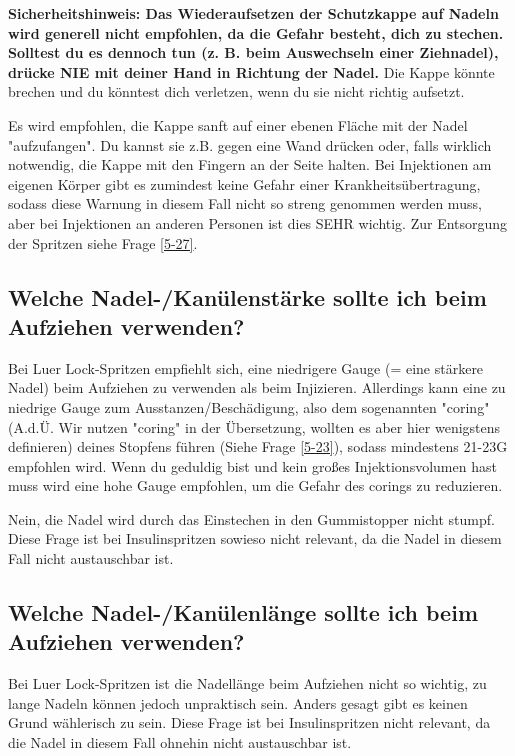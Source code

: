 \documentclass{article}
\begin{document}
\textbf{Sicherheitshinweis: Das Wiederaufsetzen der Schutzkappe auf Nadeln wird generell nicht empfohlen, da die Gefahr besteht, dich zu stechen. Solltest du es dennoch tun (z. B. beim Auswechseln einer Ziehnadel), drücke NIE mit deiner Hand in Richtung der Nadel.} Die Kappe könnte brechen und du könntest dich verletzen, wenn du sie nicht richtig aufsetzt.

Es wird empfohlen, die Kappe sanft auf einer ebenen Fläche mit der Nadel "aufzufangen". Du kannst sie z.B. gegen eine Wand drücken oder, falls wirklich notwendig, die Kappe mit den Fingern an der Seite halten. Bei Injektionen am eigenen Körper gibt es zumindest keine Gefahr einer Krankheitsübertragung, sodass diese Warnung in diesem Fall nicht so streng genommen werden muss, aber bei Injektionen an anderen Personen ist dies SEHR wichtig. Zur Entsorgung der Spritzen siehe Frage \ref{5-27}.

\subsection{Welche Nadel-/Kanülenstärke sollte ich beim Aufziehen verwenden?}

Bei Luer Lock-Spritzen empfiehlt sich, eine niedrigere Gauge (= eine stärkere Nadel) beim Aufziehen zu verwenden als beim Injizieren. Allerdings kann eine zu niedrige Gauge zum Ausstanzen/Beschädigung, also dem sogenannten "coring" (A.d.Ü. Wir nutzen "coring" in der Übersetzung, wollten es aber hier wenigstens definieren) deines Stopfens führen (Siehe Frage \ref{5-23}), sodass mindestens 21-23G empfohlen wird. Wenn du geduldig bist und kein großes Injektionsvolumen hast muss wird eine hohe Gauge empfohlen, um die Gefahr des corings zu reduzieren. 

Nein, die Nadel wird durch das Einstechen in den Gummistopper nicht stumpf. Diese Frage ist bei Insulinspritzen sowieso nicht relevant, da die Nadel in diesem Fall nicht austauschbar ist.

\subsection{Welche Nadel-/Kanülenlänge sollte ich beim Aufziehen verwenden?}

Bei Luer Lock-Spritzen ist die Nadellänge beim Aufziehen nicht so wichtig, zu lange Nadeln können jedoch unpraktisch sein. Anders gesagt gibt es keinen Grund wählerisch zu sein. Diese Frage ist bei Insulinspritzen nicht relevant, da die Nadel in diesem Fall ohnehin nicht austauschbar ist.
\end{document}
